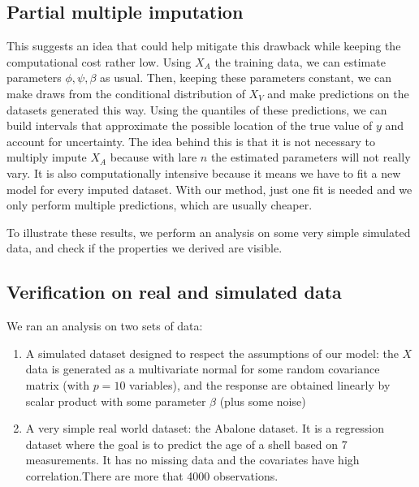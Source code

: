 \subsection{Partial multiple imputation}
This suggests an idea that could help mitigate this drawback while keeping the computational cost rather low. Using $X_A$ the training data, we can estimate parameters $\phi, \psi, \beta$ as usual. Then, keeping these parameters constant, we can make draws from the conditional distribution of $X_V$ and make predictions on the datasets generated this way. Using the quantiles of these predictions, we can build intervals that approximate the possible location of the true value of $y$ and account for uncertainty. The idea behind this is that it is not necessary to multiply impute $X_A$ because with lare $n$ the estimated parameters will not really vary. It is also computationally intensive because it means we have to fit a new model for every imputed dataset. With our method, just one fit is needed and we only perform multiple predictions, which are usually cheaper.

To illustrate these results, we perform an analysis on some very simple simulated data, and check if the properties we derived are visible.
		\subsection{Verification on real and simulated data}
We ran an analysis on two sets of data:
\begin{enumerate}
\item A simulated dataset designed to respect the assumptions of our model: the $X$ data is generated as a multivariate normal for some random covariance matrix (with $p=10$ variables), and the response are obtained linearly by scalar product with some parameter $\beta$ (plus some noise)
\item A very simple real world dataset: the Abalone dataset. It is a regression dataset where the goal is to predict the age of a shell based on 7 measurements. It has no missing data and the covariates have high correlation.There are more that 4000 observations.
\end{enumerate}

